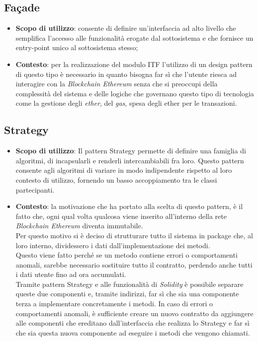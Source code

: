 \subsection{Façade}
\begin{itemize}
	\item \textbf{Scopo di utilizzo}: consente di definire un'interfaccia ad alto livello che semplifica l'accesso alle funzionalità erogate dal sottosistema e che fornisce un entry-point unico al sottosistema stesso;
	\item \textbf{Contesto}: per la realizzazione del modulo \gls{ITF} l'utilizzo di un design pattern di questo tipo è necessario in quanto bisogna far sì che l'utente riesca ad interagire con la \textit{Blockchain Ethereum} senza che si preoccupi della complessità del sistema e delle logiche che governano questo tipo di tecnologia come la gestione degli \emph{\gls{ether}}\glsfirstoccur, del \emph{\gls{gas}}\glsfirstoccur, spesa degli \gls{ether} per le transazioni.
\end{itemize}
\subsection{Strategy}
\begin{itemize}
	\item \textbf{Scopo di utilizzo}: Il pattern Strategy permette di definire una famiglia di algoritmi, di incapsularli e renderli intercambiabili fra loro. Questo pattern consente agli algoritmi di variare in modo indipendente rispetto al loro contesto di utilizzo, fornendo un basso accoppiamento tra le classi partecipanti.
	\item \textbf{Contesto}: la motivazione che ha portato alla scelta di questo pattern, è il fatto che, ogni qual volta qualcosa viene inserito all'interno della rete \textit{Blockchain Ethereum} diventa immutabile.\\
	Per questo motivo si è deciso di strutturare tutto il sistema in package che, al loro interno, dividessero i dati dall'implementazione dei metodi.\\
	Questo viene fatto perché se un metodo contiene errori o comportamenti anomali, sarebbe necessario sostituire tutto il contratto, perdendo anche tutti i dati utente fino ad ora accumulati.\\
	Tramite pattern Strategy e alle funzionalità di \textit{Solidity} è possibile separare queste due componenti e, tramite indirizzi, far sì che sia una componente terza a implementare concretamente i metodi.
	In caso di errori o comportamenti anomali, è sufficiente creare un nuovo contratto da aggiungere alle componenti che ereditano dall'interfaccia che realizza lo Strategy e far sì che sia questa nuova componente ad eseguire i metodi che vengono chiamati.
\end{itemize}
